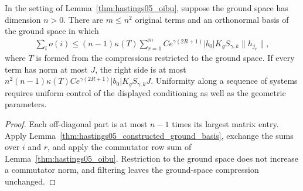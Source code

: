 \begin{lemma}
    \label{thm:hastings05_constructed_oibu}
    \leanok
    In the setting of Lemma~\ref{thm:hastings05_oibu}, suppose the ground
    space has dimension $n>0$. There are $m\le n^2$ original terms and an
    orthonormal basis of the ground space in which
    \begin{align*}
        \sum_i o(i)\le(n-1)\kappa(T)\sum_{r=1}^m
        Ce^{\gamma(2R+1)}|b_0|K_gS_{\gamma,k}\|h_{j_r}\|,
    \end{align*}
    where $T$ is formed from the compressions restricted to the ground space.
    If every term has norm at most $J$, the right side is at most
    $n^2(n-1)\kappa(T)Ce^{\gamma(2R+1)}|b_0|K_gS_{\gamma,k}J$.
    Uniformity along a sequence of systems requires uniform control of the
    displayed conditioning as well as the geometric parameters.
\end{lemma}
\begin{proof}\leanok
    Each off-diagonal part is at most $n-1$ times its largest matrix entry.
    Apply Lemma~\ref{thm:hastings05_constructed_ground_basis}, exchange the
    sums over $i$ and $r$, and apply the commutator row sum of
    Lemma~\ref{thm:hastings05_oibu}. Restriction to the ground space does not
    increase a commutator norm, and filtering leaves the ground-space
    compression unchanged.
\end{proof}


